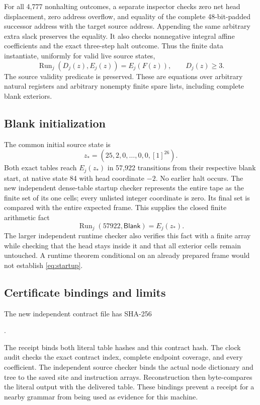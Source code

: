 \documentclass[10pt,a4paper]{article}
\newcommand{\Run}{\operatorname{Run}}
\newcommand{\Blank}{\mathsf{Blank}}
\theoremstyle{definition}
\begin{document}
For all 4,777 nonhalting outcomes, a separate inspector checks zero net
head displacement, zero address overflow, and equality of the complete
48-bit-padded successor address with the target source address. Appending
the same arbitrary extra slack preserves the equality. It also checks
nonnegative integral affine coefficients and the exact three-step halt
outcome. Thus the finite data instantiate, uniformly for valid live
source states,
\begin{equation}
 \Run_j(D_j(z),E_j(z))=E_j(F(z)),\qquad D_j(z)\ge3.
 \label{eq:local}
\end{equation}
The source validity predicate is preserved. These are equations over
arbitrary natural registers and arbitrary nonempty finite spare lists,
including complete blank exteriors.

\subsection{Blank initialization}

The common initial source state is
\[
                 z_*=(25,2,0,\ldots,0,0,[1]^{26}).
\]
Both exact tables reach $E_j(z_*)$ in 57,922 transitions from their
respective blank start, at native state 84 with head coordinate $-2$.
No earlier halt occurs. The new independent dense-table startup checker
represents the entire tape as the finite set of its one cells; every
unlisted integer coordinate is zero. Its final set is compared with the
entire expected frame. This supplies the closed finite arithmetic fact
\begin{equation}
             \Run_j(57922,\Blank)=E_j(z_*).
 \label{eq:startup}
\end{equation}
The larger independent runtime checker also verifies this fact with a
finite array while checking that the head stays inside it and that all
exterior cells remain untouched. A runtime theorem conditional on an
already prepared frame would not establish \eqref{eq:startup}.

\subsection{Certificate bindings and limits}

The new independent contract file has SHA-256
\begin{center}\small
{}.
\end{center}
The receipt binds both literal table hashes and this contract hash. The
clock audit checks the exact contract index, complete endpoint coverage,
and every coefficient. The independent source checker binds the actual
node dictionary and tree to the saved site and instruction arrays.
Reconstruction then byte-compares the literal output with the delivered
table. These bindings prevent a receipt for a nearby grammar from being
used as evidence for this machine.
\end{document}
